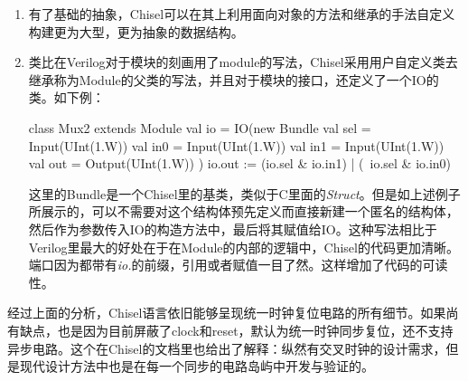 \begin{enumerate}[label=(\alph*)]
	\item 有了基础的抽象，Chisel可以在其上利用面向对象的方法和继承的手法自定义构建更为大型，更为抽象的数据结构。
	\item 类比在Verilog对于模块的刻画用了module的写法，Chisel采用用户自定义类去继承称为Module的父类的写法，并且对于模块的接口，还定义了一个IO的类。如下例\citep{chisel2017}：
	\begin{scala}
		class Mux2 extends Module {
			val io = IO(new Bundle{
				val sel = Input(UInt(1.W))
				val in0 = Input(UInt(1.W))
				val in1 = Input(UInt(1.W))
				val out = Output(UInt(1.W))
			})
			io.out := (io.sel & io.in1) | (~io.sel & io.in0)
		}
	\end{scala}
	这里的Bundle是一个Chisel里的基类，类似于C里面的\textit{Struct}。但是如上述例子所展示的，可以不需要对这个结构体预先定义而直接新建一个匿名的结构体，然后作为参数传入IO的构造方法中，最后将其赋值给IO。这种写法相比于Verilog里最大的好处在于在Module的内部的逻辑中，Chisel的代码更加清晰。端口因为都带有\textit{io.}的前缀，引用或者赋值一目了然。这样增加了代码的可读性。
\end{enumerate}

经过上面的分析，Chisel语言依旧能够呈现统一时钟复位电路的所有细节。如果尚有缺点，也是因为目前屏蔽了clock和reset，默认为统一时钟同步复位，还不支持异步电路。这个在Chisel的文档里也给出了解释：纵然有交叉时钟的设计需求，但是现代设计方法中也是在每一个同步的电路岛屿中开发与验证的\citep{chisel2017}。

